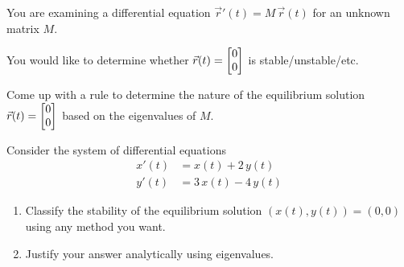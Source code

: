 \documentclass{workbook}
\begin{document}
\begin{slide}
	\question
	You are examining a differential equation $\vec r'(t) = M\, \vec r(t)$ for an unknown matrix $M$.

	 You would like to determine whether $\vec r(t)=\mat{0\\0}$ is stable/unstable/etc.
	\begin{parts}
		\item Come up with a rule to determine the nature of the equilibrium solution $\vec r(t) =\mat{0\\0}$ based on the eigenvalues of $M$.
		\item Consider the system of differential equations
		\begin{align*}
			x'(t) &= x(t)+2\,y(t)\\
			y'(t) &= 3\, x(t)-4\,y(t)
		\end{align*}
		\begin{enumerate}
			\item Classify the stability of the equilibrium solution $(x(t), y(t))=(0,0)$ using any method you want.
			\item Justify your answer analytically using eigenvalues.
		\end{enumerate}
	\end{parts}
\end{slide}

%
%
\end{document}
